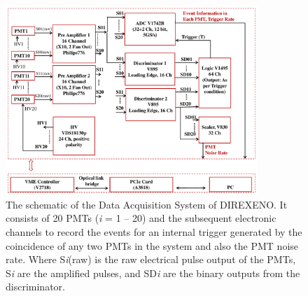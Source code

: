 \begin{figure}[h]
   \centering
   \includegraphics[width=0.85\textwidth]{DAQscheme.pdf}
   \caption{The schematic of the Data Acquisition System of DIREXENO. It 
        consists of 20 PMTs ({\it i} = 1 -- 20) and the subsequent electronic channels to record 
        the events for an internal trigger generated by the coincidence of any 
        two PMTs in the system and also the PMT noise rate. Where S{\it i}(raw) is the raw electrical pulse output of the PMTs, S{\it i} are 
        the amplified pulses, and SD{\it i} are the binary outputs from the discriminator. 
}
   \label{Fig:DAQscheme}
\end{figure}



